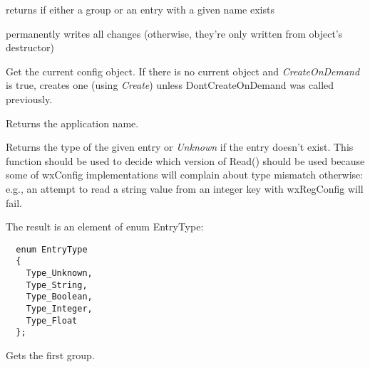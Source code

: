\label{wxconfigbaseexists}


returns \true if either a group or an entry with a given name exists


\label{wxconfigbaseflush}


permanently writes all changes (otherwise, they're only written from object's
destructor)


\label{wxconfigbaseget}


Get the current config object. If there is no current object and
{\it CreateOnDemand} is true, creates one
(using {\it Create}) unless DontCreateOnDemand was called previously.


\label{wxconfigbasegetappname}


Returns the application name.


\label{wxconfigbasegetentrytype}


Returns the type of the given entry or {\it Unknown} if the entry doesn't
exist. This function should be used to decide which version of Read() should
be used because some of wxConfig implementations will complain about type
mismatch otherwise: e.g., an attempt to read a string value from an integer
key with wxRegConfig will fail.

The result is an element of enum EntryType:

\begin{verbatim}
  enum EntryType
  {
    Type_Unknown,
    Type_String,
    Type_Boolean,
    Type_Integer,
    Type_Float
  };
\end{verbatim}


\label{wxconfigbasegetfirstgroup}


Gets the first group.

